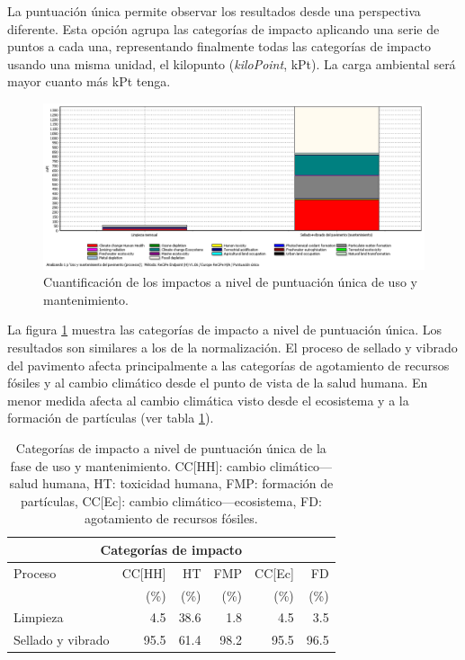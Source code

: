 La puntuación única permite observar los resultados desde una perspectiva diferente. Esta opción agrupa las categorías de impacto aplicando una serie de puntos a cada una, representando finalmente todas las categorías de impacto usando una misma unidad, el kilopunto (\textit{kiloPoint}, kPt). La carga ambiental será mayor cuanto más kPt tenga.

\begin{figure}[!htb]
\centering
\includegraphics[width=15cm]{img/uso_puntuacionunica.png}
\caption{Cuantificación de los impactos a nivel de puntuación única de uso y mantenimiento.}
\label{fig:uso_puntuacionunica}
\end{figure}

La figura \ref{fig:uso_puntuacionunica} muestra las categorías de impacto a nivel de puntuación única. Los resultados son similares a los de la normalización. El proceso de sellado y vibrado del pavimento afecta principalmente a las categorías de agotamiento de recursos fósiles y al cambio climático desde el punto de vista de la salud humana. En menor medida afecta al cambio climática visto desde el ecosistema y a la formación de partículas (ver tabla \ref{categoriasimpactousopuntunica}).

\begin{table}[!htb]
\centering
\begin{tabular}{p{4cm}rrrrr}
\toprule
\multicolumn{6}{c}{Categorías de impacto}\\
\midrule
Proceso & CC[HH] & HT & FMP & CC[Ec] & FD\\
 &  (\%) & (\%) & (\%) & (\%) & (\%)\\
\midrule
Limpieza & 4.5 & 38.6 & 1.8 & 4.5 & 3.5\\
Sellado y vibrado & 95.5 & 61.4 & 98.2 & 95.5 & 96.5\\
\bottomrule
\end{tabular}
\caption[Categorías de impacto a nivel de puntuación única de la fase de uso y mantenimiento.]{Categorías de impacto a nivel de puntuación única de la fase de uso y mantenimiento. CC[HH]: cambio climático—salud humana, HT: toxicidad humana, FMP: formación de partículas, CC[Ec]: cambio climático—ecosistema, FD: agotamiento de recursos fósiles.}
\label{categoriasimpactousopuntunica}
\end{table}

